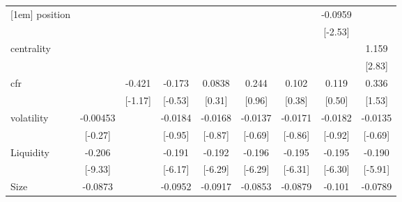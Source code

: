{\begin{tabular}{l*{8}{c}}
[1em]
position            &                     &                     &                     &                     &                     &                     &     -0.0959\sym{*}  &                     \\
                    &                     &                     &                     &                     &                     &                     &     [-2.53]         &                     \\
[1em]
centrality          &                     &                     &                     &                     &                     &                     &                     &       1.159\sym{**} \\
                    &                     &                     &                     &                     &                     &                     &                     &      [2.83]         \\
[1em]
cfr                 &                     &      -0.421         &      -0.173         &      0.0838         &       0.244         &       0.102         &       0.119         &       0.336         \\
                    &                     &     [-1.17]         &     [-0.53]         &      [0.31]         &      [0.96]         &      [0.38]         &      [0.50]         &      [1.53]         \\
[1em]
volatility          &    -0.00453         &                     &     -0.0184         &     -0.0168         &     -0.0137         &     -0.0171         &     -0.0182         &     -0.0135         \\
                    &     [-0.27]         &                     &     [-0.95]         &     [-0.87]         &     [-0.69]         &     [-0.86]         &     [-0.92]         &     [-0.69]         \\
[1em]
Liquidity           &      -0.206\sym{***}&                     &      -0.191\sym{***}&      -0.192\sym{***}&      -0.196\sym{***}&      -0.195\sym{***}&      -0.195\sym{***}&      -0.190\sym{***}\\
                    &     [-9.33]         &                     &     [-6.17]         &     [-6.29]         &     [-6.29]         &     [-6.31]         &     [-6.30]         &     [-5.91]         \\
[1em]
Size                &     -0.0873\sym{**} &                     &     -0.0952\sym{*}  &     -0.0917\sym{*}  &     -0.0853\sym{*}  &     -0.0879\sym{*}  &      -0.101\sym{*}  &     -0.0789         \\

\end{tabular}}
